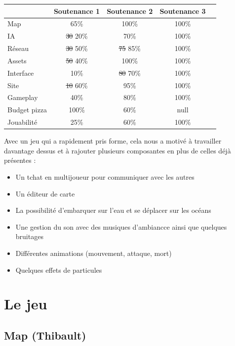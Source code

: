 \documentclass[12pt]{report}
\begin{document}
\begin{center}
    \begin{tabular}{@{} l *4c @{}}
        \toprule
        \multicolumn{1}{c}{}    & \textbf{Soutenance 1}  & \textbf{Soutenance 2}  & \textbf{Soutenance 3} \\ 
        \midrule
        Map & 65\% & 100\% & 100\% \\
        IA & \sout{30} {\color{red} 20}\% & 70\% & 100\% \\
        Réseau & \sout{30} {\color{green} 50}\% & \sout{75} {\color{green} 85}\% & 100\% \\
        Assets & \sout{50} {\color{red} 40}\% & 100\% & 100\% \\
        Interface & 10\% & \sout{80} {\color{red} 70}\% & 100\% \\
        Site & \sout{10} {\color{green} 60}\% & 95\% & 100\% \\
        Gameplay & 40\% & 80\% & 100\% \\
        Budget pizza & 100\% & 60\% & null\\
        \midrule
        Jouabilité & 25\% & 60\% & 100\% \\
        \bottomrule
    \end{tabular}
\end{center}

Avec un jeu qui a rapidement pris forme, cela nous a motivé à travailler
davantage dessus et à rajouter plusieurs composantes en plus de celles déjà
présentes :

\begin{itemize}
    \item Un tchat en multijoueur pour communiquer avec les autres
    \item Un éditeur de carte
    \item La possibilité d'embarquer sur l'eau et se déplacer sur les océans
    \item Une gestion du son avec des musiques d'ambiancce ainsi que quelques
        bruitages
    \item Différentes animations (mouvement, attaque, mort)
    \item Quelques effets de particules
\end{itemize}

\chapter{Le jeu}

\section{Map (Thibault)}
\end{document}

